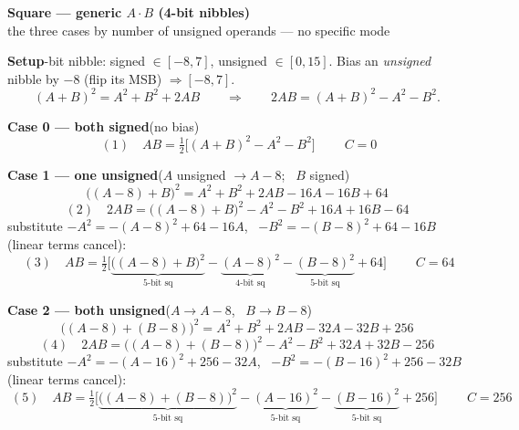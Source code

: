 \documentclass[fleqn]{article}
\begin{document}
\begin{center}
{\LARGE \textbf{Square --- generic $A\cdot B$ (4-bit nibbles)}}\\[4pt]
{\large the three cases by number of unsigned operands --- no specific mode}
\end{center}

\vspace{0.5em}

\textbf{Setup}-bit nibble: signed $\in[-8,7]$, unsigned $\in[0,15]$. Bias an \emph{unsigned} nibble by $-8$ (flip its MSB) $\Rightarrow[-8,7]$.
\[
(A{+}B)^2 = A^2 + B^2 + 2AB
\qquad\Longrightarrow\qquad
2AB = (A{+}B)^2 - A^2 - B^2 .
\]

\vspace{0.3em}

\textbf{Case 0 --- both signed}\quad(no bias)
\[
\boxed{\;(1)\quad AB = \tfrac12\big[(A{+}B)^2 - A^2 - B^2\big]\;}\qquad C=0
\]

\vspace{0.3em}

\textbf{Case 1 --- one unsigned}\quad($A$ unsigned $\to A{-}8$; \ $B$ signed)
\[
\big((A{-}8){+}B\big)^2 = A^2 + B^2 + 2AB - 16A - 16B + 64
\]
\[
(2)\quad 2AB = \big((A{-}8){+}B\big)^2 - A^2 - B^2 + 16A + 16B - 64
\]
substitute $-A^2 = -(A{-}8)^2 + 64 - 16A$, \ $-B^2 = -(B{-}8)^2 + 64 - 16B$ (linear terms cancel):
\[
\boxed{\;(3)\quad AB = \tfrac12\Big[\underbrace{\big((A{-}8){+}B\big)^2}_{\text{5-bit sq}} - \underbrace{(A{-}8)^2}_{\text{4-bit sq}} - \underbrace{(B{-}8)^2}_{\text{5-bit sq}} + 64\Big]\;}\qquad C=64
\]

\vspace{0.3em}

\textbf{Case 2 --- both unsigned}\quad($A\to A{-}8$, \ $B\to B{-}8$)
\[
\big((A{-}8){+}(B{-}8)\big)^2 = A^2 + B^2 + 2AB - 32A - 32B + 256
\]
\[
(4)\quad 2AB = \big((A{-}8){+}(B{-}8)\big)^2 - A^2 - B^2 + 32A + 32B - 256
\]
substitute $-A^2 = -(A{-}16)^2 + 256 - 32A$, \ $-B^2 = -(B{-}16)^2 + 256 - 32B$ (linear terms cancel):
\[
\boxed{\;(5)\quad AB = \tfrac12\Big[\underbrace{\big((A{-}8){+}(B{-}8)\big)^2}_{\text{5-bit sq}} - \underbrace{(A{-}16)^2}_{\text{5-bit sq}} - \underbrace{(B{-}16)^2}_{\text{5-bit sq}} + 256\Big]\;}\qquad C=256
\]

\vspace{0.6em}
\end{document}

